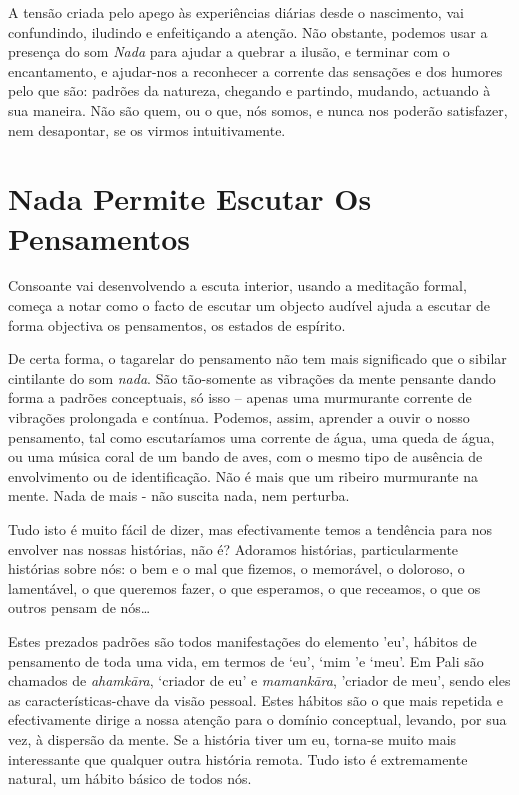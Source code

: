 A tensão criada pelo apego às experiências diárias desde o nascimento,
vai confundindo, iludindo e enfeitiçando a atenção. Não obstante,
podemos usar a presença do som \emph{Nada} para ajudar a quebrar a
ilusão, e terminar com o encantamento, e ajudar-nos a reconhecer a
corrente das sensações e dos humores pelo que são: padrões da natureza,
chegando e partindo, mudando, actuando à sua maneira. Não são quem, ou o
que, nós somos, e nunca nos poderão satisfazer, nem desapontar, se os
virmos intuitivamente.

\section{Nada Permite Escutar Os Pensamentos}

Consoante vai desenvolvendo a escuta interior, usando a meditação
formal, começa a notar como o facto de escutar um objecto audível ajuda
a escutar de forma objectiva os pensamentos, os estados de espírito.

De certa forma, o tagarelar do pensamento não tem mais significado que o
sibilar cintilante do som \emph{nada}. São tão-somente as vibrações da
mente pensante dando forma a padrões conceptuais, só isso -- apenas uma
murmurante corrente de vibrações prolongada e contínua. Podemos, assim,
aprender a ouvir o nosso pensamento, tal como escutaríamos uma corrente
de água, uma queda de água, ou uma música coral de um bando de aves, com
o mesmo tipo de ausência de envolvimento ou de identificação. Não é mais
que um ribeiro murmurante na mente. Nada de mais - não suscita nada, nem
perturba.

Tudo isto é muito fácil de dizer, mas efectivamente temos a tendência
para nos envolver nas nossas histórias, não é? Adoramos histórias,
particularmente histórias sobre nós: o bem e o mal que fizemos, o
memorável, o doloroso, o lamentável, o que queremos fazer, o que
esperamos, o que receamos, o que os outros pensam de nós\ldots{}

Estes prezados padrões são todos manifestações do elemento 'eu', hábitos
de pensamento de toda uma vida, em termos de `eu', `mim 'e `meu'. Em
Pali são chamados de \emph{ahamkāra}, `criador de eu' e
\emph{mamankāra}, 'criador de meu', sendo eles as características-chave
da visão pessoal. Estes hábitos são o que mais repetida e efectivamente
dirige a nossa atenção para o domínio conceptual, levando, por sua vez,
à dispersão da mente. Se a história tiver um eu, torna-se muito mais
interessante que qualquer outra história remota. Tudo isto é
extremamente natural, um hábito básico de todos nós.

